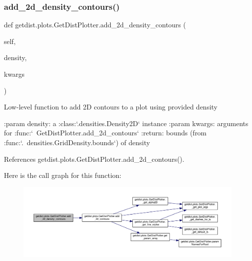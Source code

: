 \subsubsection{\texorpdfstring{add\+\_\+2d\+\_\+density\+\_\+contours()}{add\_2d\_density\_contours()}}
{\footnotesize\ttfamily def getdist.\+plots.\+Get\+Dist\+Plotter.\+add\+\_\+2d\+\_\+density\+\_\+contours (\begin{DoxyParamCaption}\item[{}]{self,  }\item[{}]{density,  }\item[{}]{kwargs }\end{DoxyParamCaption})}

\begin{DoxyVerb}Low-level function to add 2D contours to a plot using provided density

:param density: a :class:`.densities.Density2D` instance
:param kwargs: arguments for :func:`~GetDistPlotter.add_2d_contours`
:return: bounds (from :func:`.~densities.GridDensity.bounds`) of density
\end{DoxyVerb}
 

References getdist.\+plots.\+Get\+Dist\+Plotter.\+add\+\_\+2d\+\_\+contours().

Here is the call graph for this function\+:
\nopagebreak
\begin{figure}[H]
\begin{center}
\leavevmode
\includegraphics[width=350pt]{classgetdist_1_1plots_1_1GetDistPlotter_aa778142d973eb5a21663b564743b77d6_cgraph}
\end{center}
\end{figure}
\mbox{\label{classgetdist_1_1plots_1_1GetDistPlotter_a3f9f0b8a62a5e803e002da9b1c40e248}} 
